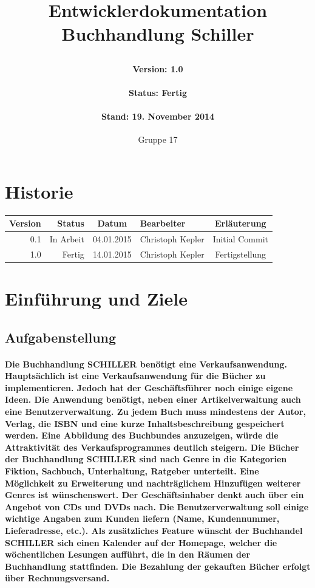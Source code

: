 \documentclass[a4paper]{article}
\author{Gruppe 17}
\date{}
\title{
	\normalfont
	\normalsize 
	\huge{Entwicklerdokumentation Buchhandlung Schiller}
	\horrule{0.5pt}
	\paragraph{Version: 1.0}
	\paragraph{Status: Fertig}
	\paragraph{Stand: 19. November 2014}
	\horrule{2pt}
}
\begin{document}
\maketitle

\newpage
 
\section*{Historie}

\begin{tabular}{|r|r|c|l|c|}
	\hline
	\rowcolor[HTML]{C0C0C0} 
	Version & Status    & Datum      & Bearbeiter       & Erläuterung    	\\ \hline
	0.1     & In Arbeit & 04.01.2015 & Christoph Kepler & Initial Commit 	\\ \hline
	1.0     & Fertig 	& 14.01.2015 & Christoph Kepler & Fertigstellung 	\\ \hline
\end{tabular}

\newpage


\tableofcontents

\newpage

\section{Einführung und Ziele}

\subsection{Aufgabenstellung}

\paragraph{Die Buchhandlung SCHILLER benötigt eine Verkaufsanwendung. Hauptsächlich ist eine Verkaufsanwendung für die Bücher zu implementieren. Jedoch hat der Geschäftsführer noch einige eigene Ideen. 
Die Anwendung benötigt, neben einer Artikelverwaltung auch eine Benutzerverwaltung. Zu jedem Buch muss mindestens der Autor, Verlag, die ISBN und eine kurze Inhaltsbeschreibung gespeichert werden. Eine Abbildung des Buchbundes anzuzeigen, würde die Attraktivität des Verkaufsprogrammes deutlich steigern. Die Bücher der Buchhandlung SCHILLER sind nach Genre in die Kategorien Fiktion, Sachbuch, Unterhaltung, Ratgeber unterteilt. Eine Möglichkeit zu Erweiterung und nachträglichem Hinzufügen weiterer Genres ist wünschenswert. Der Geschäftsinhaber denkt auch über ein Angebot von CDs und DVDs nach. Die Benutzerverwaltung soll einige wichtige Angaben zum Kunden liefern (Name, Kundennummer, Lieferadresse, etc.). 
Als zusätzliches Feature wünscht der Buchhandel SCHILLER sich einen Kalender auf der Homepage, welcher die wöchentlichen Lesungen aufführt, die in den Räumen der Buchhandlung stattfinden. Die Bezahlung der gekauften Bücher erfolgt über Rechnungsversand.}
\end{document}
